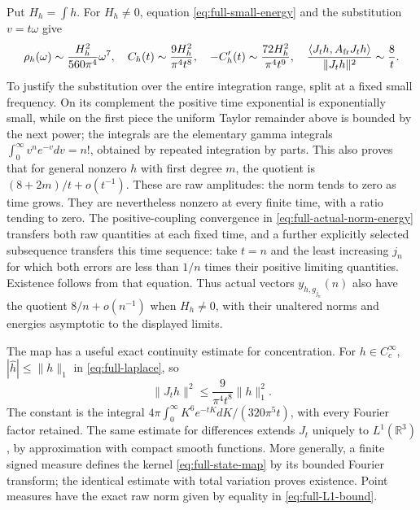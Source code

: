 Put $H_h=\int h$. For $H_h\ne0$, equation
\eqref{eq:full-small-energy} and the substitution $v=t\omega$
give
\begin{equation}\label{eq:full-large-time}
 \rho_h(\omega)\sim\frac{H_h^2}{560\pi^4}\omega^7,
 \quad C_h(t)\sim\frac{9H_h^2}{\pi^4t^8},\quad
 -C_h'(t)\sim\frac{72H_h^2}{\pi^4t^9},\quad
 \frac{\langle J_th,A_{\rm fr}J_th\rangle}{\|J_th\|^2}
       \sim\frac8t.
\end{equation}
To justify the substitution over the entire integration range,
split at a fixed small frequency. On its complement the positive
time exponential is exponentially small, while on the first piece
the uniform Taylor remainder above is bounded by the next power;
the integrals are the elementary gamma integrals
$\int_0^\infty v^n e^{-v}dv=n!$, obtained by repeated integration
by parts. This also proves that for general nonzero $h$ with
first degree $m$, the quotient is $(8+2m)/t+o(t^{-1})$.
These are raw amplitudes: the norm tends to zero as time grows.
They are nevertheless nonzero at every finite time, with a ratio
tending to zero. The positive-coupling convergence in
\eqref{eq:full-actual-norm-energy} transfers both raw quantities at
each fixed time, and a further explicitly selected subsequence
transfers this time sequence: take $t=n$ and the least increasing
$j_n$ for which both errors are less than $1/n$ times their
positive limiting quantities. Existence follows from that equation.
Thus actual vectors $y_{h,g_{j_n}}(n)$ also have the quotient
$8/n+o(n^{-1})$ when $H_h\ne0$, with their unaltered norms and
energies asymptotic to the displayed limits.

The map has a useful exact continuity estimate for concentration.
For $h\in C_c^\infty$, $|\widehat h|\le\|h\|_1$ in
\eqref{eq:full-laplace}, so
\begin{equation}\label{eq:full-L1-bound}
 \|J_t h\|^2\le \frac{9}{\pi^4t^8}\|h\|_1^2.
\end{equation}
The constant is the integral
$4\pi\int_0^\infty K^6e^{-tK}dK/(320\pi^5t)$, with every
Fourier factor retained. The same estimate for differences extends
$J_t$ uniquely to $L^1(\mathbb R^3)$, by approximation with
compact smooth functions. More generally, a finite signed measure
defines the kernel \eqref{eq:full-state-map} by its bounded Fourier
transform; the identical estimate with total variation proves
existence. Point measures have the exact raw norm given by equality
in \eqref{eq:full-L1-bound}.


